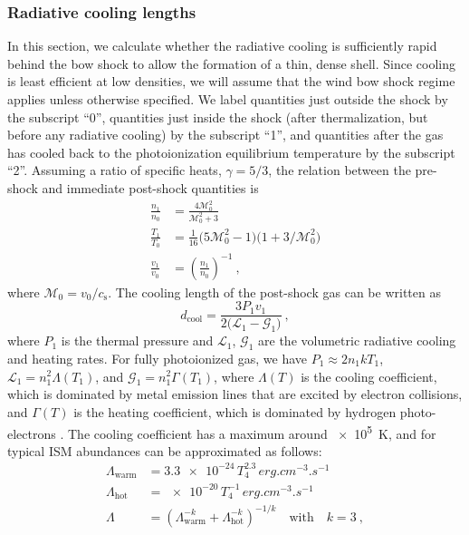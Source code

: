 \message{ !name(dusty-bow-wave.tex)}\documentclass[useAMS, usenatbib, a4paper]{mnras}
\newcommand\sound{\ensuremath{c_{\text{s}}}}
\begin{document}
\subsubsection{Radiative cooling lengths}
\label{sec:radi-cool-lengths}
\newcommand\M{\ensuremath{\mathcal{M}}}
In this section, we calculate whether the radiative cooling is
sufficiently rapid behind the bow shock to allow the formation of a
thin, dense shell.  Since cooling is least efficient at low densities,
we will assume that the wind bow shock regime applies unless otherwise
specified. We label quantities just outside the shock by the subscript
``0'', quantities just inside the shock (after thermalization, but
before any radiative cooling) by the subscript ``1'', and quantities
after the gas has cooled back to the photoionization equilibrium
temperature by the subscript ``2''.  Assuming a ratio of specific
heats, \(\gamma = 5/3\), the relation between the pre-shock and immediate
post-shock quantities is
\begin{align}
  \label{eq:shock-n-jump}
  \frac{n_1}{n_0} &= \frac{4 \M_0^2} {\M_0^2 + 3} \\
  \label{eq:shock-T-jump}
  \frac{T_1}{T_0} &= \tfrac1{16} \bigl( 5\M_0^2 - 1 \bigr) \bigl( 1 + 3/\M_0^2 \bigr) \\
  \label{eq:shock-v-jump}
  \frac{v_1}{v_0} &= \left(\frac{n_1}{n_0}\right)^{-1} \ ,
\end{align}
where \(\M_0 = v_0 / \sound\).  The cooling length of the post-shock
gas can be written as
\newcommand\cool{\ensuremath{_{\text{cool}}}}
\begin{equation}
  \label{eq:dcool}
  d\cool = \frac{3 P_1 v_1} { 2 \bigl(  \mathcal{L}_1 - \mathcal{G}_1 \bigr) }\ ,  
\end{equation}
where \(P_1\) is the thermal pressure and \(\mathcal{L}_1\),
\(\mathcal{G}_1\) are the volumetric radiative cooling and heating
rates.  For fully photoionized gas, we have
\(P_1 \approx 2 n_1 k T_1\), \(\mathcal{L}_1 = n_1^2 \Lambda(T_1)\), and
\(\mathcal{G}_1 = n_1^2 \Gamma(T_1)\), where \(\Lambda(T)\) is the cooling
coefficient, which is dominated by metal emission lines that are
excited by electron collisions, and \(\Gamma(T)\) is the heating
coefficient, which is dominated by hydrogen photo-electrons
\citep{Osterbrock:2006a}. The cooling coefficient has a maximum around
\SI{e5}{K}, and for typical ISM abundances can be approximated as
follows:
\begin{align}
  \label{eq:cooling-coefficient}
  \Lambda_{\text{warm}} &= \num{3.3e-24} \, T_4^{2.3} \, \si{erg.cm^{-3}.s^{-1}}\\
  \Lambda_{\text{hot}} &= \num{e-20} \, T_4^{-1}\, \si{erg.cm^{-3}.s^{-1}} \\
  \Lambda &= \left( \Lambda_{\text{warm}}^{-k} +  \Lambda_{\text{hot}}^{-k} \right)^{-1/k}
      \quad \text{with} \quad k = 3 \ ,
\end{align}
\end{document}
